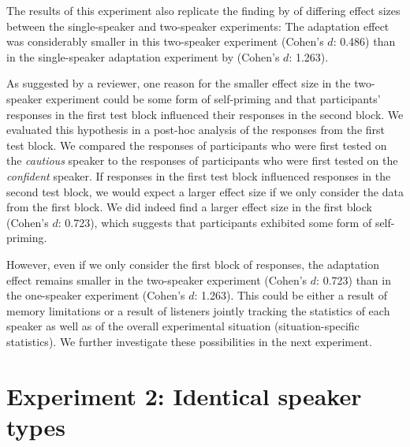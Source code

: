 The results of this experiment also replicate the 
finding by \cite{Yildirim2016} of differing effect sizes between the single-speaker and
two-speaker experiments: The adaptation effect
was considerably smaller in this two-speaker experiment (Cohen's $d$: 0.486) than in 
the single-speaker adaptation experiment by \cite{Schuster2018} (Cohen's $d$: 1.263). 

As suggested by a reviewer, one reason for the smaller effect size in the two-speaker
experiment could be some form of self-priming and that participants' responses in the first 
test block influenced their responses in the second block. We evaluated this hypothesis
in a post-hoc analysis of the responses from the first test block. We 
compared the responses of participants who were first
tested on the \textit{cautious} speaker to the responses of participants who were first tested 
on the \textit{confident} speaker. If responses in the first test block influenced responses in 
the second test block, we would expect a larger effect size if we only consider the data
from the first block. We did indeed find a larger effect size in the first block (Cohen's $d$: 0.723), which
suggests that participants exhibited some form of self-priming.


However, even if we only consider the first block of responses, the adaptation effect 
remains smaller in the two-speaker experiment (Cohen's $d$: 0.723) than in the
one-speaker experiment (Cohen's $d$: 1.263). This could be either a result of memory limitations 
or a result of listeners jointly tracking the statistics of each speaker
as well as of the overall experimental situation (situation-specific statistics).
We further investigate these possibilities in the next experiment.


\section{Experiment 2: Identical speaker types}

